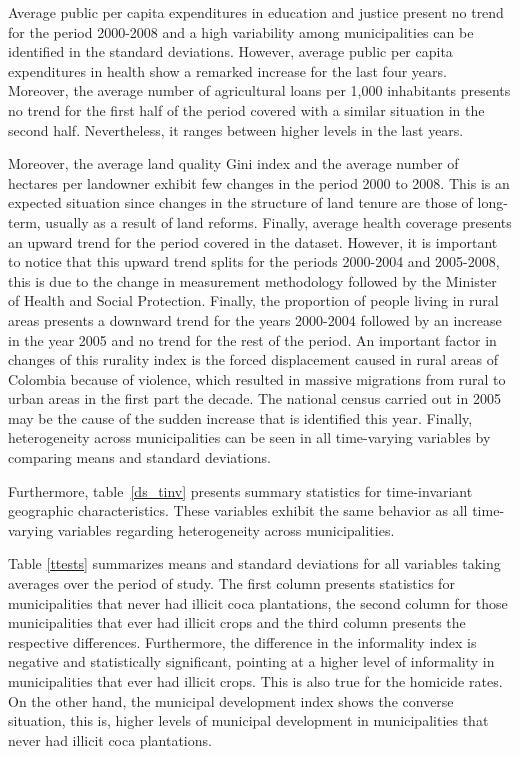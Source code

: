 \documentclass[a4paper, 12pt]{article}
\begin{document}
Average public per capita expenditures in education and justice present no trend for the period 2000-2008 and a high variability among municipalities can be identified in the standard deviations. However, average public per capita expenditures in health show a remarked increase for the last four years. Moreover, the average number of agricultural loans per 1,000 inhabitants presents no trend for the first half of the period covered with a similar situation in the second half. Nevertheless, it ranges between higher levels in the last years.

Moreover, the average land quality Gini index and the average number of hectares per landowner exhibit few changes in the period 2000 to 2008. This is an expected situation since changes in the structure of land tenure are those of long-term, usually as a result of land reforms. Finally, average health coverage presents an upward trend for the period covered in the dataset. However, it is important to notice that this upward trend splits for the periods 2000-2004 and 2005-2008, this is due to the change in measurement methodology followed by the Minister of Health and Social Protection. Finally, the proportion of people living in rural areas presents a downward trend for the years 2000-2004 followed by an increase in the year 2005 and no trend for the rest of the period. An important factor in changes of this rurality index is the forced displacement caused in rural areas of Colombia because of violence, which resulted in massive migrations from rural to urban areas in the first part the decade. The national census carried out in 2005 may be the cause of the sudden increase that is identified this year. Finally, heterogeneity across municipalities can be seen in all time-varying variables by comparing means and standard deviations.

Furthermore, table~\ref{ds_tinv} presents summary statistics for time-invariant geographic characteristics. These variables exhibit the same behavior as all time-varying variables regarding heterogeneity across municipalities.

Table \ref{ttests} summarizes means and standard deviations for all variables taking averages over the period of study. The first column presents statistics for municipalities that never had illicit coca plantations, the second column for those municipalities that ever had illicit crops and the third column presents the respective differences. Furthermore, the difference in the informality index is negative and statistically significant, pointing at a higher level of informality in municipalities that ever had illicit crops. This is also true for the homicide rates. On the other hand, the municipal development index shows the converse situation, this is, higher levels of municipal development in municipalities that never had illicit coca plantations.
\end{document}
